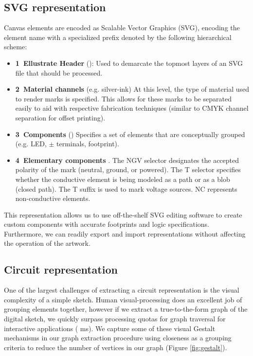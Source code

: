 \documentclass{sigchi}
\begin{document}
    \subsection{SVG representation}
    Canvas elements are encoded as Scalable Vector Graphics (SVG), encoding the element name with a specialized prefix denoted by the following hierarchical scheme:
    \begin{itemize}
        \item \textbf{1\degree~Ellustrate Header} (): Used to demarcate the topmost layers of an SVG file that should be processed.
        \item \textbf{2\degree~Material channels} (e.g.  silver-ink) At this level, the type of material used to render marks is specified. This allows for these marks to be separated easily to aid with respective fabrication techniques (similar to CMYK channel separation for offset printing).
        \item \textbf{3\degree~Components} () Specifies a set of elements that are conceptually grouped (e.g. LED, $\pm$ terminals, footprint).
        \item \textbf{4\degree~Elementary components} .
        The N\textbar G\textbar V selector designates the accepted polarity of the mark (neutral, ground, or powered). The T selector specifies whether the conductive element is being modeled as a path or as a blob (closed path). The T suffix is used to mark voltage sources. NC represents non-conductive elements.
    \end{itemize}

    This representation allows us to use off-the-shelf SVG editing software to create custom components with accurate footprints and logic specifications. Furthermore, we can readily export and import representations without affecting the operation of the artwork.

    \subsection{Circuit representation}
      One of the largest challenges of extracting a circuit representation is the visual complexity of a simple sketch. Human visual-processing does an excellent job of grouping elements together, however if we extract a true-to-the-form graph of the digital sketch, we quickly surpass processing quotas for graph traversal for interactive applications ( ms). We capture some of these visual Gestalt mechanisms in our graph extraction procedure using closeness as a grouping criteria to reduce the number of vertices in our graph (Figure \ref{fig:gestalt}). 
\end{document}
